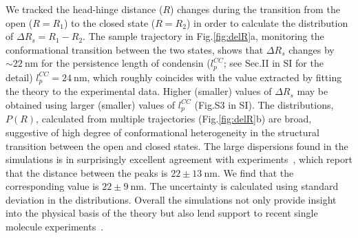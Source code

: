 \documentclass[fleqn,10pt]{wlscirep}
\newcommand{\nm}{\ \mathrm{nm}}
\newcommand{\vR}{R}
\newcommand{\DR}{\Delta {R}}
\begin{document}
We tracked the head-hinge distance ($\vR$) changes during the transition from the open ($\vR=R_1$) to the closed state ($\vR=R_2$) in order to calculate the distribution of  $\Delta R_s =R_1-R_2$. The sample trajectory in Fig.\ref{fig:delR}a, monitoring the conformational transition between the two states, shows that $\DR_s$ changes by $\sim 22\nm$ for the persistence length of condensin ($l^{CC}_p$; see Sec.II in SI for the detail) $l^{CC}_p = 24 \nm$, which roughly coincides with the value extracted by fitting the theory  to the experimental data.  Higher (smaller) values of $\Delta R_s$ may be obtained using larger (smaller) values of $l_p^{CC}$ (Fig.S3 in SI).
The distributions, $P(\vR)$, calculated from multiple trajectories (Fig.\ref{fig:delR}b) are broad, suggestive of high degree of conformational heterogeneity in the structural transition between the open and closed states. The large dispersions found in the simulations is in surprisingly excellent agreement with experiments~\cite{ryu2020condensin}, which report that the distance between the peaks is $22 \pm  13\nm$.  We find that the corresponding value is $22 \pm 9 \nm$. The uncertainty is calculated using standard deviation in the distributions.  Overall the simulations not only provide insight into the physical basis of the theory but also lend support to recent single molecule experiments~\cite{ryu2020condensin}.
\end{document}
